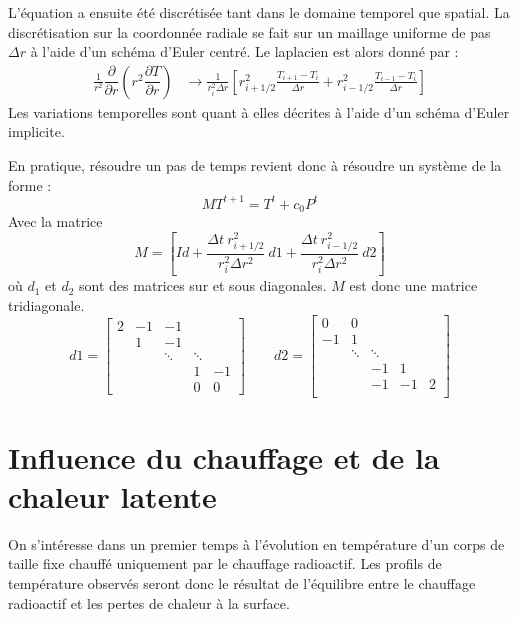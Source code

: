 \documentclass[10pt,a4paper]{article}
\numberwithin{equation}{section}
\begin{document}
L'équation a ensuite été discrétisée tant dans le domaine temporel que spatial. La discrétisation sur la coordonnée radiale se fait sur un maillage uniforme de pas $\Delta r$ à l'aide d'un schéma d'Euler centré. Le laplacien est alors donné par :
\begin{align}
\frac{1}{r^2} \dfrac{\partial }{\partial r}\left( r^2 \dfrac{\partial T}{\partial r} \right) &\rightarrow \frac{1}{r^2_i \Delta r}\left[ r^2_{i+1/2}\frac{T_{i+1} - T_{i}}{\Delta r} + r^2_{i-1/2}\frac{T_{i-1} - T_{i}}{\Delta r} \right]
\end{align}
Les variations temporelles sont quant à elles décrites à l'aide d'un schéma d'Euler implicite.
\medskip

En pratique, résoudre un pas de temps revient donc à résoudre un système de la forme :
\begin{equation}
MT^{t+1} = T^t + c_0 P^{t}
\end{equation}
Avec la matrice $$M = \left[ Id + \frac{\Delta t ~ r^2_{i+1/2}}{r^2_i \Delta r^2} ~ d1 + \frac{\Delta t ~ r^2_{i-1/2}}{r^2_i \Delta r^2} ~ d2  \right]$$
où $d_1$ et $d_2$ sont des matrices sur et sous diagonales. $M$ est donc une matrice tridiagonale.
$$
d1=
\begin{bmatrix}
    2      & -1     & -1       &   \\
           &  1     & -1              &             \\
     &        & \ddots    &\ddots       \\
     &        &            & 1 & -1         \\
         &   &      &   0         &  0
\end{bmatrix}
\qquad
d2=
\begin{bmatrix}
     0     & 0      &   &     &        \\
    -1     & 1      &  &          &            \\
     & \ddots & \ddots &    &      \\
     &              &  -1      &  1         \\
         &      &  -1     & -1        & 2 \\
\end{bmatrix}
$$

\section{Influence du chauffage et de la chaleur latente}
On s'intéresse dans un premier temps à l'évolution en température d'un corps de taille fixe chauffé uniquement par le chauffage radioactif. Les profils de température observés seront donc le résultat de l'équilibre entre le chauffage radioactif et les pertes de chaleur à la surface.
\end{document}
